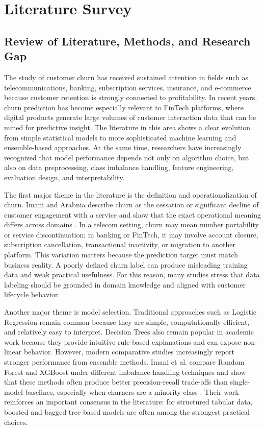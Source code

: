 \chapter{Literature Survey}

\section{Review of Literature, Methods, and Research Gap}
The study of customer churn has received sustained attention in fields such as telecommunications, banking, subscription services, insurance, and e-commerce because customer retention is strongly connected to profitability. In recent years, churn prediction has become especially relevant to FinTech platforms, where digital products generate large volumes of customer interaction data that can be mined for predictive insight. The literature in this area shows a clear evolution from simple statistical models to more sophisticated machine learning and ensemble-based approaches. At the same time, researchers have increasingly recognized that model performance depends not only on algorithm choice, but also on data preprocessing, class imbalance handling, feature engineering, evaluation design, and interpretability.

The first major theme in the literature is the definition and operationalization of churn. Imani and Arabnia describe churn as the cessation or significant decline of customer engagement with a service and show that the exact operational meaning differs across domains \cite{systematicreview}. In a telecom setting, churn may mean number portability or service discontinuation; in banking or FinTech, it may involve account closure, subscription cancellation, transactional inactivity, or migration to another platform. This variation matters because the prediction target must match business reality. A poorly defined churn label can produce misleading training data and weak practical usefulness. For this reason, many studies stress that data labeling should be grounded in domain knowledge and aligned with customer lifecycle behavior.

Another major theme is model selection. Traditional approaches such as Logistic Regression remain common because they are simple, computationally efficient, and relatively easy to interpret. Decision Trees also remain popular in academic work because they provide intuitive rule-based explanations and can expose non-linear behavior. However, modern comparative studies increasingly report stronger performance from ensemble methods. Imani et al. compare Random Forest and XGBoost under different imbalance-handling techniques and show that these methods often produce better precision-recall trade-offs than single-model baselines, especially when churners are a minority class \cite{imani2024}. Their work reinforces an important consensus in the literature: for structured tabular data, boosted and bagged tree-based models are often among the strongest practical choices.

